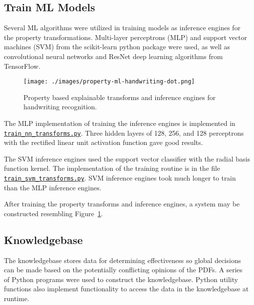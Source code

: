 \subsection{Train ML Models}

Several ML algorithms were utilized in training models as inference engines for
the property transformations. Multi-layer perceptrons (MLP) and support vector
machines (SVM) from the scikit-learn\cite{scikitlearn} python package were used,
as well as convolutional neural networks and ResNet deep learning algorithms
from TensorFlow\cite{tensorflow2015-whitepaper}.

\begin{figure}[H]
    \centerline{\texttt{[image: ./images/property-ml-handwriting-dot.png]}}
    \caption{Property based explainable transforms and inference engines for handwriting recognition.}
    \label{fig:prop_trans_inference_handwriting}
\end{figure}

The MLP implementation of training the inference engines is implemented in
\href{https://gitlab.com/paulwhitten/2023-svm-xai/-/blob/main/train_nn_transforms.py}{\texttt{train\_nn\_transforms.py}}\cite{whitten2024icmi_source}.
Three hidden layers of 128, 256, and 128 perceptrons with the rectified linear
unit activation function gave good results.

The SVM inference engines used the support vector classifier with the radial
basis function kernel. The implementation of the training routine is in the file
\href{https://gitlab.com/paulwhitten/2023-svm-xai/-/blob/main/train_svm_transforms.py}{\texttt{train\_svm\_transforms.py}}\cite{whitten2024icmi_source}.
SVM inference engines took much longer to train than the MLP inference engines.

After training the property transforms and inference engines, a system may be
constructed resembling Figure~\ref{fig:prop_trans_inference_handwriting}.

\subsection{Knowledgebase}

The knowledgebase stores data for determining effectiveness so global decisions
can be made based on the potentially conflicting opinions of the PDFs. A series
of Python programs were used to construct the knowledgebase. Python utility
functions also implement functionality to access the data in the knowledgebase
at runtime.

